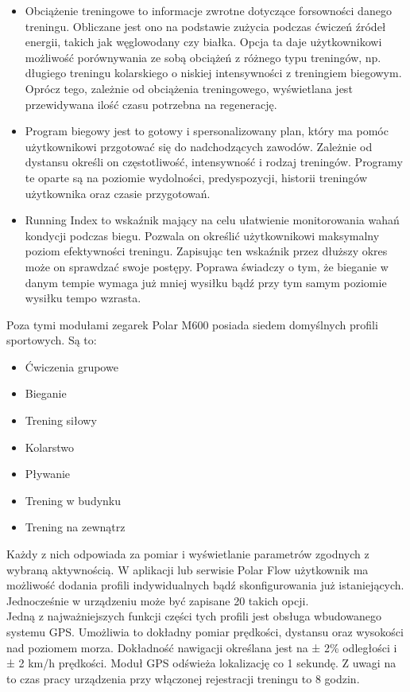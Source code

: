 \documentclass[a4paper,12pt,reqno]{article}
\begin{document}
\begin{itemize}
	\item Obciążenie treningowe to informacje zwrotne dotyczące forsowności danego treningu. Obliczane jest ono na podstawie zużycia podczas ćwiczeń źródeł energii, takich jak węglowodany czy białka. Opcja ta daje użytkownikowi możliwość porównywania ze sobą obciążeń z różnego typu treningów, np. długiego treningu kolarskiego o niskiej intensywności z treningiem biegowym. Oprócz tego, zależnie od obciążenia treningowego, wyświetlana jest przewidywana ilość czasu potrzebna na regenerację.
	\item Program biegowy jest to gotowy i spersonalizowany plan, który ma pomóc użytkownikowi przgotować się do nadchodzących zawodów. Zależnie od dystansu określi on częstotliwość, intensywność i rodzaj treningów. Programy te oparte są na poziomie wydolności, predyspozycji, historii treningów użytkownika oraz czasie przygotowań.
	\item Running Index to wskaźnik mający na celu ułatwienie monitorowania wahań kondycji podczas biegu. Pozwala on określić użytkownikowi maksymalny poziom efektywności treningu. Zapisując ten wskaźnik przez dłuższy okres może on sprawdzać swoje postępy. Poprawa świadczy o tym, że bieganie w danym tempie wymaga już mniej wysiłku bądź przy tym samym poziomie wysiłku tempo wzrasta.		
\end{itemize}

Poza tymi modułami zegarek Polar M600 posiada siedem domyślnych profili sportowych. Są to:
\begin{itemize}
	\item Ćwiczenia grupowe
	\item Bieganie
	\item Trening siłowy
	\item Kolarstwo
	\item Pływanie
	\item Trening w budynku
	\item Trening na zewnątrz
\end{itemize}
 
Każdy z nich odpowiada za pomiar i wyświetlanie parametrów zgodnych z wybraną aktywnością. W aplikacji lub serwisie Polar Flow użytkownik ma możliwość dodania profili indywidualnych bądź skonfigurowania już istaniejących. Jednocześnie w urządzeniu może być zapisane 20 takich opcji.\\

Jedną z najważniejszych funkcji części tych profili jest obsługa wbudowanego systemu GPS. Umożliwia to dokładny pomiar prędkości, dystansu oraz wysokości nad poziomem morza. Dokładność nawigacji określana jest na ± 2\% odległości i ± 2 km/h prędkości. Moduł GPS odświeża lokalizację co 1 sekundę. Z uwagi na to czas pracy urządzenia przy włączonej rejestracji treningu to 8 godzin.
\end{document}
